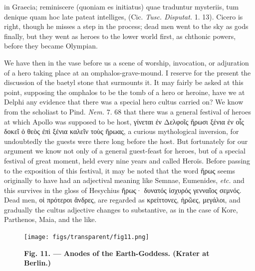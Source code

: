 \documentclass[a4paper, 11pt, oneside, polutonikogreek, english]{article}
\begin{document}
in Graecia; reminiscere (quoniam es initiatus) quae traduntur mysteriis, tum denique quam hoc late pateat intelliges, (Cic. \emph{Tusc. Disputat.} 1. 13). Cicero is right, though he misses a step in the process; dead men went to the sky as gods finally, but they went as heroes to the lower world first, as chthonic powers, before they became Olympian.

We have then in the vase before us a scene of worship, invocation, or adjuration of a hero taking place at an omphalos-grave-mound. I reserve for the present the discussion of the baetyl stone that surmounts it. It may fairly be asked at this point, supposing the omphalos to be the tomb of a hero or heroine, have we at Delphi any evidence that there was a special hero cultus carried on? We know from the scholiast to Pind. \emph{Nem.} 7. 68 that there was a general festival of heroes at which Apollo was supposed to be host, γίνεται ἐν Δελφοῖς ἥρωσι ξένια ἐν οἷς δοκεῖ ὁ θεὸς ἐπὶ ξένια καλεῖν τοὺς ἥρωας, a curious mythological inversion, for undoubtedly the guests were there long before the host. But fortunately for our argument we know not only of a general guest-feast for heroes, but of a special festival of great moment, held every nine years and called Heroïs. Before passing to the exposition of this festival, it may be noted that the word ἥρως seems originally to have had an adjectival meaning like Semnae, Eumenides, \emph{etc.} and this survives in the gloss of Hesychius ἥρως· δυνατός ἰσχυρός γενναῖος σεμνός. Dead men, οἱ πρότεροι ἄνδρες, are regarded as κρείττονες, ἡρῶες, μεγάλοι, and gradually the cultus adjective changes to substantive, as in the case of Kore, Parthenos, Maia, and the like.
\begin{figure}[H]
\centering
\texttt{[image: figs/transparent/fig11.png]}
\caption{\bfseries Fig. 11. --- Anodes of the Earth-Goddess. (Krater at Berlin.)}
\end{figure}
\end{document}
